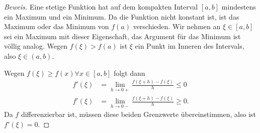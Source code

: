 \begin{proof}[Beweis]
Eine stetige Funktion hat auf dem kompakten Interval $[a,b]$ mindestens
ein Maximum und ein Minimum.
Da die Funktion nicht konstant ist, ist das Maximum oder das Minimum
von $f(a)$ verschieden.
Wir nehmen an $\xi\in[a,b]$ sei ein Maximum mit dieser Eigenschaft,
das Argument für das Minimum ist völlig analog.
Wegen $f(\xi)>f(a)$ ist $\xi$ ein Punkt im Inneren des Intervals,
also $\xi\in(a,b)$.

Wegen $f(\xi) \ge f(x)\forall x\in[a,b]$
folgt dann
\begin{align*}
f'(\xi) &= \lim_{h\to 0+}  \frac{f(\xi+h)-f(\xi)}{h} \le 0
\\
f'(\xi) &= \lim_{h\to 0-}  \frac{f(\xi+h)-f(\xi)}{h} \ge 0.
\end{align*}
Da $f$ differenzierbar ist, müssen diese beiden Grenzwerte übereinstimmen,
also ist $f'(\xi)=0$.
\end{proof}


